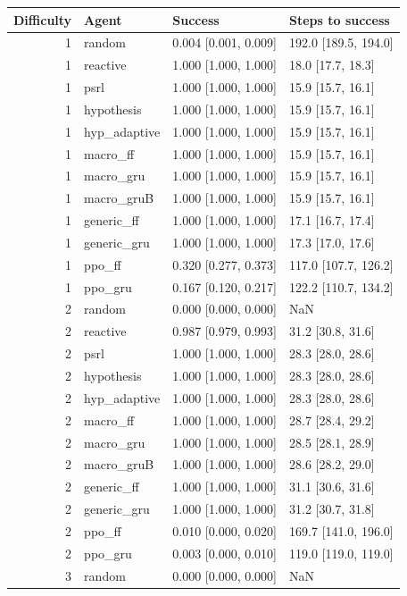 \begin{tabular}{rlll}
\toprule
Difficulty & Agent & Success & Steps to success \\
\midrule
1 & random & 0.004 [0.001, 0.009] & 192.0 [189.5, 194.0] \\
1 & reactive & 1.000 [1.000, 1.000] & 18.0 [17.7, 18.3] \\
1 & psrl & 1.000 [1.000, 1.000] & 15.9 [15.7, 16.1] \\
1 & hypothesis & 1.000 [1.000, 1.000] & 15.9 [15.7, 16.1] \\
1 & hyp\_adaptive & 1.000 [1.000, 1.000] & 15.9 [15.7, 16.1] \\
1 & macro\_ff & 1.000 [1.000, 1.000] & 15.9 [15.7, 16.1] \\
1 & macro\_gru & 1.000 [1.000, 1.000] & 15.9 [15.7, 16.1] \\
1 & macro\_gruB & 1.000 [1.000, 1.000] & 15.9 [15.7, 16.1] \\
1 & generic\_ff & 1.000 [1.000, 1.000] & 17.1 [16.7, 17.4] \\
1 & generic\_gru & 1.000 [1.000, 1.000] & 17.3 [17.0, 17.6] \\
1 & ppo\_ff & 0.320 [0.277, 0.373] & 117.0 [107.7, 126.2] \\
1 & ppo\_gru & 0.167 [0.120, 0.217] & 122.2 [110.7, 134.2] \\
2 & random & 0.000 [0.000, 0.000] & NaN \\
2 & reactive & 0.987 [0.979, 0.993] & 31.2 [30.8, 31.6] \\
2 & psrl & 1.000 [1.000, 1.000] & 28.3 [28.0, 28.6] \\
2 & hypothesis & 1.000 [1.000, 1.000] & 28.3 [28.0, 28.6] \\
2 & hyp\_adaptive & 1.000 [1.000, 1.000] & 28.3 [28.0, 28.6] \\
2 & macro\_ff & 1.000 [1.000, 1.000] & 28.7 [28.4, 29.2] \\
2 & macro\_gru & 1.000 [1.000, 1.000] & 28.5 [28.1, 28.9] \\
2 & macro\_gruB & 1.000 [1.000, 1.000] & 28.6 [28.2, 29.0] \\
2 & generic\_ff & 1.000 [1.000, 1.000] & 31.1 [30.6, 31.6] \\
2 & generic\_gru & 1.000 [1.000, 1.000] & 31.2 [30.7, 31.8] \\
2 & ppo\_ff & 0.010 [0.000, 0.020] & 169.7 [141.0, 196.0] \\
2 & ppo\_gru & 0.003 [0.000, 0.010] & 119.0 [119.0, 119.0] \\
3 & random & 0.000 [0.000, 0.000] & NaN \\

\end{tabular}
